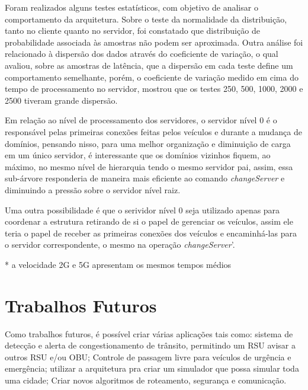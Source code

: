 \documentclass[
	12pt,				%
	oneside,			%
	a4paper,			%
	english,			%
	brazil				%
	]{abntex2ppgsi}
\begin{document}
Foram realizados alguns testes estatísticos, com objetivo de analisar o comportamento da arquitetura. Sobre o teste da normalidade da distribuição, tanto no cliente quanto no servidor, foi constatado que distribuição de probabilidade associada às amostras não podem ser aproximada. Outra análise foi relacionado à dispersão dos dados através do coeficiente de variação, o qual avaliou, sobre as amostras de latência, que a dispersão em cada teste define um comportamento semelhante, porém, o coeficiente de variação medido em cima do tempo de processamento no servidor, mostrou que os testes 250, 500, 1000, 2000 e 2500 tiveram grande dispersão.

Em relação ao nível de processamento dos servidores, o servidor nível 0 é o responsável pelas primeiras conexões feitas pelos veículos e durante a mudança de domínios, pensando nisso, para uma melhor organização e diminuição de carga em um único servidor, é interessante que os domínios vizinhos fiquem, ao máximo, no mesmo nível de hierarquia tendo o mesmo servidor pai, assim, essa sub-árvore responderia de maneira mais eficiente ao comando \textit{changeServer} e diminuindo a pressão sobre o servidor nível raiz.

Uma outra possibilidade é que o serividor nível 0 seja utilizado apenas para coordenar a estrutura retirando de si o papel de gerenciar os veículos, assim ele teria o papel de receber as primeiras conexões dos veículos e encaminhá-las para o servidor correspondente, o mesmo na operação \textit{changeServer}'.

* a velocidade 2G e 5G apresentam os mesmos tempos médios


\section{Trabalhos Futuros}

Como trabalhos futuros, é possível criar várias aplicações tais como: sistema de detecção e alerta de congestionamento de trânsito, permitindo um RSU avisar a outros RSU e/ou OBU; Controle de passagem livre para veículos de urgência e emergência; utilizar a arquitetura pra criar um simulador que possa simular toda uma cidade; Criar novos algoritmos de roteamento, segurança e comunicação.
\postextual


\end{document}
